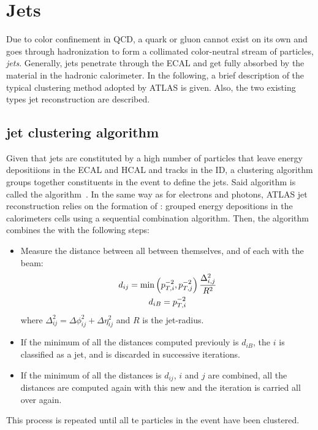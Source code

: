 \section{Jets}


Due to color confinement in \ac{QCD}, a quark or gluon cannot exist on its own and goes through hadronization to form a collimated color-neutral stream of particles, \textit{jets}. Generally, jets penetrate through the \ac{ECAL} and get fully absorbed by the material in the hadronic calorimeter. In the following, a brief description of the typical clustering method adopted by \ac{ATLAS} is given. Also, the two existing types jet reconstruction are described.


\subsection{\Antikt jet clustering algorithm}

Given that jets are constituted by a high number of particles that leave energy depositiions in the \ac{ECAL} and \ac{HCAL} and tracks in the \ac{ID}, a clustering algorithm groups together constituents in the event to define the jets. Said algorithm is called the \antikt algorithm~\cite{AntiKtAlgorithm}. In the same way as for electrons and photons, \ac{ATLAS} jet reconstruction relies on the formation of \topos: grouped energy depositions in the calorimeters cells using a sequential combination algorithm. Then, the \antikt algorithm combines the \topos with the following steps:
\begin{itemize}
    \item Measure the distance between all \topos between themselves, and of each \topo with the beam:
        \begin{gather}
            d_{ij} = \min \left( p_{T,i}^{-2}, p_{T,j}^{-2} \right) \frac{\Delta_{i,j}^2}{R^2}\\
            d_{iB} = p_{T,i}^{-2}
        \end{gather}
        where \(\Delta_{ij}^2 = \Delta\phi_{ij}^2 + \Delta\eta_{ij}^2\) and \(R\) is the jet-radius.
    \item If the minimum of all the distances computed previouly is \(d_{iB}\), the \topo \(i\) is classified as a jet, and is discarded in successive iterations.
    \item If the minimum of all the distances is \(d_{ij}\), \topos \(i\) and \(j\) are combined, all the distances are computed again with this new \topo and the iteration is carried all over again.
\end{itemize}
This process is repeated until all te particles in the event have been clustered.

